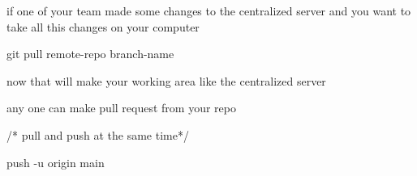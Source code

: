 if one of your team made some changes to the centralized server 
and you want to take all this changes on your computer 

git pull remote-repo  branch-name 

now that will make your working area like the centralized server 

any one can make pull request from your repo  

/*  pull and push at the same time*/

push -u origin main 